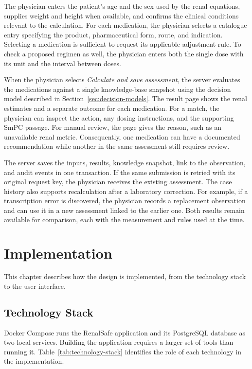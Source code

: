 \documentclass[12pt,a4paper,twoside]{book}
\begin{document}
The physician enters the patient's age and the sex used by the renal equations, supplies weight and height when available, and confirms the clinical conditions relevant to the calculation.
For each medication, the physician selects a catalogue entry specifying the product, pharmaceutical form, route, and indication.
Selecting a medication is sufficient to request its applicable adjustment rule.
To check a proposed regimen as well, the physician enters both the single dose with its unit and the interval between doses.

When the physician selects \emph{Calculate and save assessment}, the server evaluates the medications against a single knowledge-base snapshot using the decision model described in Section~\ref{sec:decision-models}.
The result page shows the renal estimates and a separate outcome for each medication.
For a match, the physician can inspect the action, any dosing instructions, and the supporting SmPC passage.
For manual review, the page gives the reason, such as an unavailable renal metric.
Consequently, one medication can have a documented recommendation while another in the same assessment still requires review.

The server saves the inputs, results, knowledge snapshot, link to the observation, and audit events in one transaction.
If the same submission is retried with its original request key, the physician receives the existing assessment.
The case history also supports recalculation after a laboratory correction.
For example, if a transcription error is discovered, the physician records a replacement observation and can use it in a new assessment linked to the earlier one.
Both results remain available for comparison, each with the measurement and rules used at the time.

\chapter{Implementation}\label{ch:implementation}

This chapter describes how the design is implemented, from the technology stack to the user interface.

\section{Technology Stack}
\label{sec:technology-stack}

Docker Compose runs the RenalSafe application and its PostgreSQL database as two local services.
Building the application requires a larger set of tools than running it.
Table~\ref{tab:technology-stack} identifies the role of each technology in the implementation.
\end{document}
